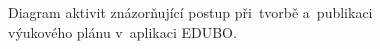 \documentclass[male,czech,api_bc]{kitheses}
\begin{document}
\begin{figure}[H]
	\centering
	\caption{Diagram aktivit znázorňující postup při~tvorbě a~publikaci výukového plánu v~aplikaci EDUBO.}
	\label{fig:activity-diagram}
\end{figure}
\end{document}
